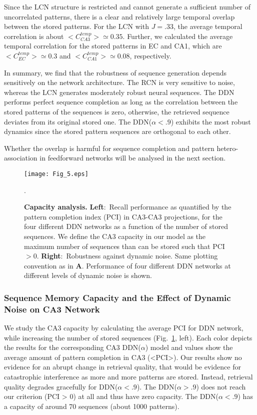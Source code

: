 \documentclass[utf8]{frontiersSCNS} %
\begin{document}
Since the LCN structure is restricted and cannot generate a sufficient number of uncorrelated patterns, there is a clear and relatively large temporal overlap between the stored patterns. For the LCN with $J = .33$, the average temporal correlation is about $<C^{temp}_{CA3}> \simeq 0.35$. 
Further, we calculated the average temporal correlation for the stored patterns in EC and CA1, which are $<C^{temp}_{EC}> \simeq 0.3$ and $<C^{temp}_{CA1}> \simeq 0.08$, respectively. 	    

In summary, we find that the robustness of sequence generation depends sensitively on the network architecture. The RCN is very sensitive to noise, whereas the LCN generates moderately robust neural sequences. The DDN performs perfect sequence completion as long as the correlation between the stored patterns of the sequences is zero, otherwise, the retrieved sequence deviates from its original stored one. The DDN($\alpha < .9$) exhibits the most robust dynamics since the stored pattern sequences are orthogonal to each other.

Whether the overlap is harmful for sequence completion and pattern hetero-association in feedforward networks will be analysed in the next section. 

\begin{figure}[!htb]
\centering\texttt{[image: Fig\_5.eps]}
\caption{\textbf{Capacity analysis.} 
\textbf{Left}:~Recall performance as quantified by the pattern completion index (PCI) in CA3-CA3 projections, for the four different DDN networks as a function of the number of stored sequences. 
We define the CA3 capacity in our model as the maximum number of sequences than can be stored such that PCI $> 0$. \textbf{Right}:~Robustness against dynamic noise.
Same plotting convention as in \textbf{A}.
Performance of four different DDN networks at different levels of dynamic noise is shown.
}.   
\label{Fig_5}
\end{figure}

\subsubsection{Sequence Memory Capacity and the Effect of Dynamic Noise on CA3 Network}

We study the CA3 capacity by calculating the average PCI for DDN network, while increasing the number of stored sequences (Fig.~\ref{Fig_5}, left). 
%
Each color depicts the results for the corresponding CA3 DDN($\alpha$) model and values show the average amount of pattern completion in CA3 (<PCI>).
%
Our results show no evidence for an abrupt change in retrieval quality, that would be evidence for catastrophic interference as more and more patterns are stored. Instead, retrieval quality degrades gracefully for DDN($\alpha < .9$).
The DDN($\alpha > .9$) does not reach our criterion (PCI > 0) at all and thus have zero capacity. The DDN($\alpha < .9$) has a capacity of around 70 sequences (about 1000 patterns).
%
\end{document}
